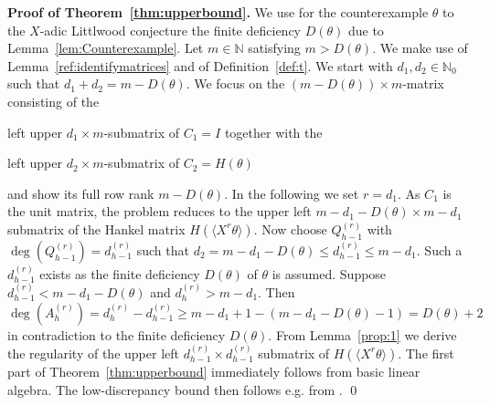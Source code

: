 \documentclass{article}
\newcommand{\NN}{\mathbb N}
\newcommand{\FF}{\mathbb{F}}
\renewcommand{\(}{\left (}
\renewcommand{\)}{\right )}
\newtheorem{theorem}{Theorem}[section]
\theoremstyle{definition}
\numberwithin{equation}{section}
\begin{document}







\textbf{Proof of Theorem~\ref{thm:upperbound}. 
}
We use for the counterexample $\theta$ to the $X$-adic Littlwood conjecture the finite deficiency $D(\theta)$ due to Lemma~\ref{lem:Counterexample}. Let $m\in\NN$ satisfying $m>D(\theta)$. We make use of Lemma~\ref{ref:identifymatrices} and of Definition~\ref{def:t}. We start with $d_1,d_2\in\NN_0$ such that $d_1+d_2=m-D(\theta)$. We focus on the $(m-D(\theta))\times m$-matrix consisting of the

left upper $d_1 \times m$-submatrix of $C_1=I$ together with the

left upper $d_2 \times m$-submatrix of $C_2=H(\theta)$ 

\noindent and show its full row rank $m-D(\theta)$. In the following we set $r=d_1$. As $C_1$ is the unit matrix, the problem reduces to the upper left $m-d_1-D(\theta)\times m-d_1$ submatrix of the Hankel matrix $H(\langle X^{r}\theta\rangle)$.  Now choose $Q^{(r)}_{h-1}$ with $\deg(Q^{(r)}_{h-1})=d^{(r)}_{h-1}$ such that 
$d_2=m-d_1-D(\theta)\leq d^{(r)}_{h-1}\leq m-d_1$. Such a $d^{(r)}_{h-1}$ exists as the finite deficiency $D(\theta)$ of $\theta$ is assumed. Suppose $d^{(r)}_{h-1}< m-d_1-D(\theta)$ and $d^{(r)}_h> m-d_1$. Then $\deg(A^{(r)}_h)=d^{(r)}_h-d^{(r)}_{h-1}\geq m-d_1+1-(m-d_1-D(\theta)-1)=D(\theta)+2$ in contradiction to the finite deficiency $D(\theta)$. %
From Lemma~\ref{prop:1} we derive the regularity of the upper left $d^{(r)}_{h-1}\times d^{(r)}_{h-1}$ submatrix of $H(\langle X^{r}\theta\rangle)$. The first part of  Theorem~\ref{thm:upperbound} immediately follows from basic linear algebra. The low-discrepancy bound then follows e.g. from \cite[Theorem~4.17]{niesiam}. \qed
\end{document}
